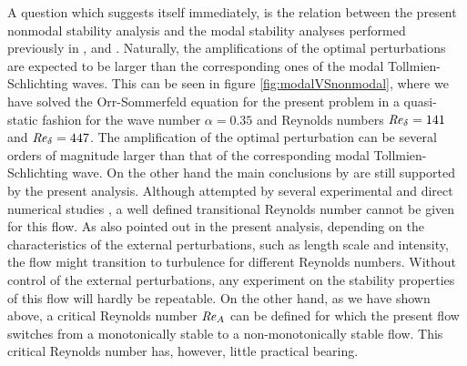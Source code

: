 \documentclass{jfm}
\newcommand\Rey{\mbox{\textit{Re}}}  %
\begin{document}
A question which suggests itself immediately, is the relation
between the present nonmodal stability analysis and
the modal stability analyses performed previously in 
\citet{BlondeauxPralitsVittori2012}, \citet{VerschaevePedersen2014}
and \citet{SadekParrasDiamessisLiu2015}.
Naturally,
the amplifications of the optimal perturbations are expected to
be larger
than the corresponding ones of the modal Tollmien-Schlichting waves.
This can be seen in figure \ref{fig:modalVSnonmodal}, where
we have solved the Orr-Sommerfeld equation
for the present problem in a quasi-static fashion for the 
wave number $ \alpha = 0.35 $ and Reynolds numbers $ \Rey_\delta = 141 $ and
$ \Rey_\delta = 447$. The amplification of the optimal perturbation can be several orders
of magnitude larger than that of the corresponding modal Tollmien-Schlichting
wave. On the other hand the main conclusions
by \citet{VerschaevePedersen2014} are still supported by the 
present analysis. Although attempted by several experimental and
direct numerical studies \citep{VittoriBlondeaux2008,SumerJensenSorensenFredsoeLiuCarstensen2010,OzdemirHsuBalachandar2013}%
, a
well defined transitional Reynolds number cannot be given for
this flow. As also pointed out in the present analysis, depending
on the characteristics of the external perturbations, such as length scale and
intensity, the flow might 
transition to turbulence for different Reynolds numbers. Without
control of the external perturbations, any experiment on
the stability properties of this flow will hardly be repeatable. 
On the other hand, as we have shown above, 
a critical Reynolds number $ \Rey_A $
can be defined for which the present flow switches from a
monotonically stable to a non-monotonically stable flow. This
critical Reynolds number has, however, little practical bearing.\\
\end{document}
